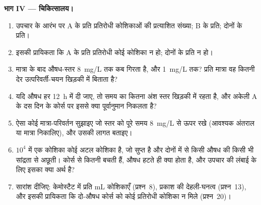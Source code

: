 \begin{problem}
\medskip
\noindent\textbf{भाग IV --- चिकित्सालय।}
\begin{enumerate}[resume]
  \item उपचार के आरंभ पर A के प्रति प्रतिरोधी कोशिकाओं की प्रत्याशित
        संख्या; B के प्रति; दोनों के प्रति।
  \item इसकी प्रायिकता कि A के प्रति प्रतिरोधी कोई कोशिका न हो; दोनों
        के प्रति न हो।
  \item मात्रा के बाद औषध-स्तर \qty{8}{mg/L} तक कब गिरता है, और
        \qty{1}{mg/L} तक? प्रति मात्रा वह कितनी देर उत्परिवर्ती-चयन
        खिड़की में बिताता है?
  \item यदि औषध हर \qty{12}{h} में दी जाए, तो समय का कितना अंश स्तर
        खिड़की में रहता है, और अकेली A के दस दिन के कोर्स पर इससे
        क्या पूर्वानुमान निकलता है?
  \item ऐसा कोई मात्रा-परिवर्तन सुझाइए जो स्तर को पूरे समय
        \qty{8}{mg/L} से ऊपर रखे (आवश्यक अंतराल या मात्रा निकालिए), और
        उसकी लागत बताइए।
  \item $10^{4}$ में एक कोशिका कोई अटल कोशिका है, जो सुप्त है और दोनों
        में से किसी औषध की किसी भी सांद्रता से अछूती। कोर्स से कितनी
        बचती हैं, औषध हटते ही क्या होता है, और उपचार की लंबाई के लिए
        इसका क्या अर्थ है?
  \item सारांश दीजिए: केमोस्टैट में प्रति mL कोशिकाएँ (प्रश्न~8),
        प्रकाश की देहली-घनत्व (प्रश्न~13), और इसकी प्रायिकता कि
        दो-औषध कोर्स को कोई प्रतिरोधी कोशिका न मिले (प्रश्न~20)।
\end{enumerate}
\end{problem}
